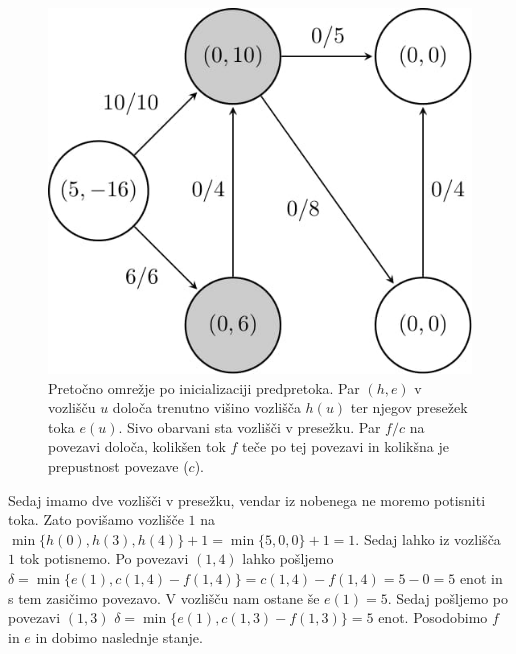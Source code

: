 \documentclass[mat1]{fmfdelo}
\begin{document}
\begin{figure}[H]
  \centering
  \includegraphics[scale=.358]{images/graf2-2/graf2-2-1.jpg}
  \caption{Pretočno omrežje po inicializaciji predpretoka. Par $(h, e)$ v vozlišču $u$ določa trenutno višino vozlišča $h(u)$ ter njegov presežek toka $e(u)$. Sivo obarvani sta vozlišči v presežku. Par $f/c$ na povezavi določa, kolikšen tok $f$ teče po tej povezavi in kolikšna je prepustnost povezave ($c$).}
\end{figure}

Sedaj imamo dve vozlišči v presežku, vendar iz nobenega ne moremo potisniti toka. Zato povišamo vozlišče $1$ na $\min \{h(0), h(3), h(4)\} + 1 = \min \{5, 0, 0\} + 1 = 1$. Sedaj lahko iz vozlišča $1$ tok potisnemo.
Po povezavi $(1,4)$ lahko pošljemo $\delta = \min\{e(1), c(1,4) - f(1,4)\} = c(1,4) - f(1,4) = 5 - 0 = 5$ enot in s tem zasičimo povezavo. V vozlišču nam ostane še $e(1) = 5$. Sedaj pošljemo po povezavi
$(1,3)$ $\delta = \min \{e(1), c(1,3) - f(1,3)\} = 5$ enot. Posodobimo $f$ in $e$ in dobimo naslednje stanje.
\end{document}
